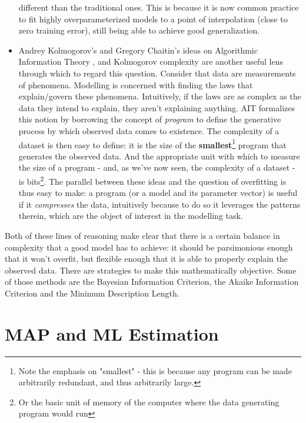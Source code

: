 \begin{itemize}
{        different than the traditional ones. This is because it is now common
        practice to fit highly overparameterized models to a point of interpolation
        (close to zero training error), still being able to achieve good generalization.}
    \item Andrey Kolmogorov's and Gregory Chaitin's ideas on Algorithmic Information
        Theory \cite{chaitin-leibniz}, and Kolmogorov complexity  are another
        useful lens through which to regard this question. Consider that data are
        measurements of phenomena. Modelling is concerned with finding the
        laws that explain/govern these phenomena. Intuitively, if the laws are
        as complex as the data they intend to explain, they aren't explaining anything.
        AIT formalizes this notion by borrowing the concept of \emph{program} to
        define the generative process by which observed data comes to existence.
        The complexity of a dataset is then easy to define: it is the size of
        the \textbf{smallest}\footnote{Note the emphasis on "smallest" - this is
        because any program can be made arbitrarily redundant, and thus arbitrarily large.}
        program that generates the observed data. And the appropriate unit with
        which to measure the size of a program - and, as we've now seen, the
        complexity of a dataset - is bits\footnote{Or the basic unit of memory
        of the computer where the data generating program would run}. The parallel
        between these ideas and the question of overfitting is thus easy to make:
        a program (or a model and its parameter vector)  is useful if it 
        \emph{compresses} the data, intuitively because to do so it leverages the
        patterns therein, which are the object of interest in the modelling task.
\end{itemize}

Both of these lines of reasoning make clear that there is a certain balance
in complexity that a good model has to achieve: it should be parsimonious enough
that it won't overfit, but flexible enough that it is able to properly explain
the observed data.  There are strategies to make this mathematically objective.
Some of those methods are the Bayesian Information Criterion, the Akaike
Information Criterion and the Minimum Description Length.

\section{MAP and ML Estimation}

